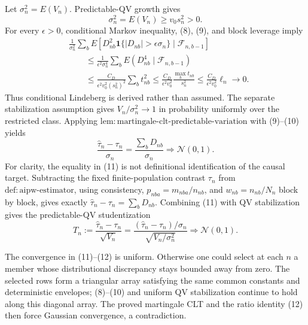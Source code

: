 Let \(\sigma_n^2=E(V_n)\).  Predictable-QV growth gives
\[
\sigma_n^2=E(V_n)\ge v_0s_n^2>0.
\tag{9}
\]
For every \(\epsilon>0\), conditional Markov inequality, (8), (9), and
block leverage imply
\[
\begin{aligned}
&\frac1{\sigma_n^2}\sum_bE\!\left[D_{nb}^2
\mathbf1\{|D_{nb}|>\epsilon\sigma_n\}
\mid\mathcal F_{n,b-1}\right]\\
&\qquad\le\frac1{\epsilon^2\sigma_n^4}
\sum_bE(D_{nb}^4\mid\mathcal F_{n,b-1})\\
&\qquad\le\frac{C_D}{\epsilon^2v_0^2(s_n^2)^2}\sum_bt_{nb}^2
\le\frac{C_D}{\epsilon^2v_0^2}
\frac{\max_bt_{nb}}{s_n^2}
\le\frac{C_D}{\epsilon^2v_0^2}\ell_n\longrightarrow0.
\end{aligned}
\tag{10}
\]
Thus conditional Lindeberg is derived rather than assumed.  The separate
stabilization assumption gives
\(V_n/\sigma_n^2\to1\) in probability uniformly over the restricted
class.  Applying
\(\mathrm{lem:martingale\text{-}clt\text{-}predictable\text{-}variation}\)
with (9)--(10) yields
\[
\frac{\widehat\tau_n-\tau_n}{\sigma_n}
=\frac{\sum_bD_{nb}}{\sigma_n}
\Rightarrow\mathcal N(0,1).
\tag{11}
\]
For clarity, the equality in (11) is not definitional identification of the
causal target.  Subtracting the fixed finite-population contrast \(\tau_n\)
from \(\mathrm{def:aipw\text{-}estimator}\), using consistency,
\(p_{nba}=m_{nba}/n_{nb}\), and \(w_{nb}=n_{nb}/N_n\) block by block,
gives exactly \(\widehat\tau_n-\tau_n=\sum_bD_{nb}\).  Combining (11) with
QV stabilization gives the predictable-QV studentization
\[
T_n:=\frac{\widehat\tau_n-\tau_n}{\sqrt{V_n}}
=\frac{(\widehat\tau_n-\tau_n)/\sigma_n}
{\sqrt{V_n/\sigma_n^2}}
\Rightarrow\mathcal N(0,1).
\tag{12}
\]

The convergence in (11)--(12) is uniform.  Otherwise one could select at
each \(n\) a member whose distributional discrepancy stays bounded away
from zero.  The selected rows form a triangular array satisfying the same
common constants and deterministic envelopes; (8)--(10) and uniform QV
stabilization continue to hold along this diagonal array.  The proved
martingale CLT and the ratio identity (12) then force Gaussian convergence,
a contradiction.

